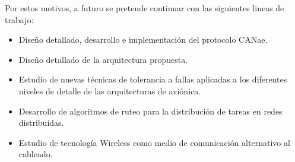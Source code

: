 Por estos motivos, a futuro se pretende continuar con las siguientes lineas de trabajo:
\begin{itemize}
\item Diseño detallado, desarrollo e implementación del protocolo CANae.
\item Diseño detallado de la arquitectura propuesta.
\item Estudio de nuevas técnicas de tolerancia a fallas aplicadas a los diferentes niveles
de detalle de las arquitecturas de aviónica.
\item Desarrollo de algoritmos de ruteo para la distribución de tareas en redes distribuidas.
\item Estudio de tecnología Wireless como medio de comunicación alternativo al cableado.
\end{itemize}

